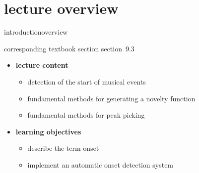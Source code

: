 


\subtitle{module 9.3: onset detection}


	

    \section[overview]{lecture overview}
        \begin{frame}{introduction}{overview}
            \begin{block}{corresponding textbook section}
                    section~9.3
            \end{block}

            \begin{itemize}
                \item   \textbf{lecture content}
                    \begin{itemize}
                        \item   detection of the start of musical events
                        \item   fundamental methods for generating a novelty function
                        \item   fundamental methods for peak picking
                    \end{itemize}
                \bigskip
                \item<2->   \textbf{learning objectives}
                    \begin{itemize}
                        \item   describe the term onset
                        \item   implement an automatic onset detection system
                    \end{itemize}
            \end{itemize}
        \end{frame}

